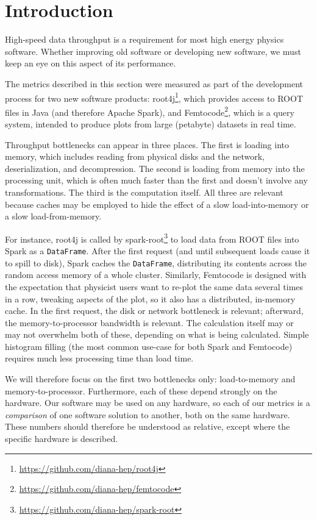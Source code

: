 \documentclass[12pt]{article}
\begin{document}
\section*{Introduction}

High-speed data throughput is a requirement for most high energy physics software. Whether improving old software or developing new software, we must keep an eye on this aspect of its performance.

The metrics described in this section were measured as part of the development process for two new software products: root4j\footnote{\url{https://github.com/diana-hep/root4j}}, which provides access to ROOT files in Java (and therefore Apache Spark), and Femtocode\footnote{\url{https://github.com/diana-hep/femtocode}}, which is a query system, intended to produce plots from large (petabyte) datasets in real time.

Throughput bottlenecks can appear in three places. The first is loading into memory, which includes reading from physical disks and the network, deserialization, and decompression. The second is loading from memory into the processing unit, which is often much faster than the first and doesn't involve any transformations. The third is the computation itself. All three are relevant because caches may be employed to hide the effect of a slow load-into-memory or a slow load-from-memory.

For instance, root4j is called by spark-root\footnote{\url{https://github.com/diana-hep/spark-root}} to load data from ROOT files into Spark as a {\tt DataFrame}. After the first request (and until subsequent loads cause it to spill to disk), Spark caches the {\tt DataFrame}, distributing its contents across the random access memory of a whole cluster. Similarly, Femtocode is designed with the expectation that physicist users want to re-plot the same data several times in a row, tweaking aspects of the plot, so it also has a distributed, in-memory cache. In the first request, the disk or network bottleneck is relevant; afterward, the memory-to-processor bandwidth is relevant. The calculation itself may or may not overwhelm both of these, depending on what is being calculated. Simple histogram filling (the most common use-case for both Spark and Femtocode) requires much less processing time than load time.

We will therefore focus on the first two bottlenecks only: load-to-memory and memory-to-processor. Furthermore, each of these depend strongly on the hardware. Our software may be used on any hardware, so each of our metrics is a {\it comparison} of one software solution to another, both on the same hardware. These numbers should therefore be understood as relative, except where the specific hardware is described.
\end{document}
